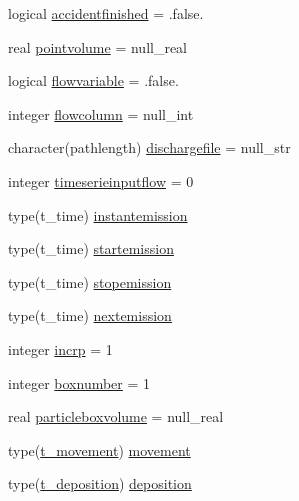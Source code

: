 \begin{DoxyCompactItemize}
logical \mbox{\hyperlink{structmodulelagrangianglobal_1_1t__origin_a9421762526548bb5483cdafaae91cd98}{accidentfinished}} = .false.
\item 
real \mbox{\hyperlink{structmodulelagrangianglobal_1_1t__origin_a2305468e6139b19b9bfad9f56b2aa3af}{pointvolume}} = null\+\_\+real
\item 
logical \mbox{\hyperlink{structmodulelagrangianglobal_1_1t__origin_a706de72e0e3a246a63da0660f2cfd223}{flowvariable}} = .false.
\item 
integer \mbox{\hyperlink{structmodulelagrangianglobal_1_1t__origin_ae362664f5dec5eb3e176aeabc0db8cfd}{flowcolumn}} = null\+\_\+int
\item 
character(pathlength) \mbox{\hyperlink{structmodulelagrangianglobal_1_1t__origin_a7653b09786f6b491014386b2cc92ea9f}{dischargefile}} = null\+\_\+str
\item 
integer \mbox{\hyperlink{structmodulelagrangianglobal_1_1t__origin_aa3e5a681cac30fdecf2d01b8178fcee2}{timeserieinputflow}} = 0
\item 
type(t\+\_\+time) \mbox{\hyperlink{structmodulelagrangianglobal_1_1t__origin_a8a4ca691de69aca7309d90ad452278cf}{instantemission}}
\item 
type(t\+\_\+time) \mbox{\hyperlink{structmodulelagrangianglobal_1_1t__origin_ae40f34c1a5be27306bf790351ea00a87}{startemission}}
\item 
type(t\+\_\+time) \mbox{\hyperlink{structmodulelagrangianglobal_1_1t__origin_af69e095c999e91de335d7a2f0d8a9f4e}{stopemission}}
\item 
type(t\+\_\+time) \mbox{\hyperlink{structmodulelagrangianglobal_1_1t__origin_a5e964e0a6b545bf954cd8ff20d8e4ee7}{nextemission}}
\item 
integer \mbox{\hyperlink{structmodulelagrangianglobal_1_1t__origin_abb791d4c7740d77ab8f7c7bfc4eabebe}{incrp}} = 1
\item 
integer \mbox{\hyperlink{structmodulelagrangianglobal_1_1t__origin_acb7f4df276a823c16fb01f0a639df8f4}{boxnumber}} = 1
\item 
real \mbox{\hyperlink{structmodulelagrangianglobal_1_1t__origin_a8f7a3b7e11bfc0ee64b606ec5ec1d58f}{particleboxvolume}} = null\+\_\+real
\item 
type(\mbox{\hyperlink{structmodulelagrangianglobal_1_1t__movement}{t\+\_\+movement}}) \mbox{\hyperlink{structmodulelagrangianglobal_1_1t__origin_a3ae8e1b8f133683b956c939c61825694}{movement}}
\item 
type(\mbox{\hyperlink{structmodulelagrangianglobal_1_1t__deposition}{t\+\_\+deposition}}) \mbox{\hyperlink{structmodulelagrangianglobal_1_1t__origin_ad0d9c1d8d68050d4bda57553c31b4b7f}{deposition}}

\end{DoxyCompactItemize}
